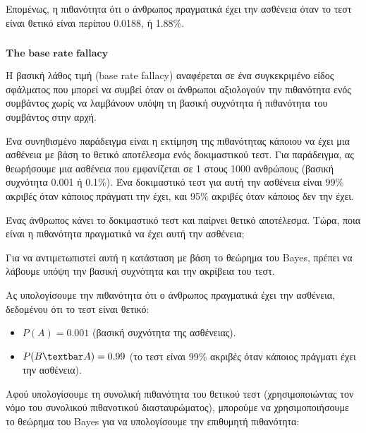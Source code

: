 \documentclass[11pt]{article}
\makeatletter
\providecommand{\tightlist}{%
      \setlength{\itemsep}{0pt}\setlength{\parskip}{0pt}}
\newcommand{\boxspacing}{\kern\kvtcb@left@rule\kern\kvtcb@boxsep}
\newcommand{\prompt}[4]{
        {\ttfamily\llap{{\color{#2}[#3]:\hspace{3pt}#4}}\vspace{-\baselineskip}}
    }
\makeatother
\begin{document}
Επομένως, η πιθανότητα ότι ο άνθρωπος πραγματικά έχει την ασθένεια όταν
το τεστ είναι θετικό είναι περίπου 0.0188, ή 1.88\%.

    \begin{tcolorbox}[breakable, size=fbox, boxrule=1pt, pad at break*=1mm,colback=cellbackground, colframe=cellborder]
\prompt{In}{incolor}{ }{\boxspacing}
\begin{Verbatim}[commandchars=\\\{\}]

\end{Verbatim}
\end{tcolorbox}

    \(\textbf{The base rate fallacy}\)

    Η βασική λάθος τιμή (base rate fallacy) αναφέρεται σε ένα συγκεκριμένο
είδος σφάλματος που μπορεί να συμβεί όταν οι άνθρωποι αξιολογούν την
πιθανότητα ενός συμβάντος χωρίς να λαμβάνουν υπόψη τη βασική συχνότητα ή
πιθανότητα του συμβάντος στην αρχή.

Ένα συνηθισμένο παράδειγμα είναι η εκτίμηση της πιθανότητας κάποιου να
έχει μια ασθένεια με βάση το θετικό αποτέλεσμα ενός δοκιμαστικού τεστ.
Για παράδειγμα, ας θεωρήσουμε μια ασθένεια που εμφανίζεται σε 1 στους
1000 ανθρώπους (βασική συχνότητα 0.001 ή 0.1\%). Ένα δοκιμαστικό τεστ
για αυτή την ασθένεια είναι 99\% ακριβές όταν κάποιος πράγματι την έχει,
και 95\% ακριβές όταν κάποιος δεν την έχει.

Ένας άνθρωπος κάνει το δοκιμαστικό τεστ και παίρνει θετικό αποτέλεσμα.
Τώρα, ποια είναι η πιθανότητα πραγματικά να έχει αυτή την ασθένεια;

Για να αντιμετωπιστεί αυτή η κατάσταση με βάση το θεώρημα του Bayes,
πρέπει να λάβουμε υπόψη την βασική συχνότητα και την ακρίβεια του τεστ.

Ας υπολογίσουμε την πιθανότητα ότι ο άνθρωπος πραγματικά έχει την
ασθένεια, δεδομένου ότι το τεστ είναι θετικό:

\begin{itemize}
\tightlist
\item
  $ P(A) = 0.001 $ (βασική συχνότητα της ασθένειας).
\item
  $ P(B\textbar A) = 0.99 $ (το τεστ είναι 99\% ακριβές όταν κάποιος
  πράγματι έχει την ασθένεια).
\end{itemize}

Αφού υπολογίσουμε τη συνολική πιθανότητα του θετικού τεστ
(χρησιμοποιώντας τον νόμο του συνολικού πιθανοτικού διασταυρώματος),
μπορούμε να χρησιμοποιήσουμε το θεώρημα του Bayes για να υπολογίσουμε
την επιθυμητή πιθανότητα:
\end{document}
